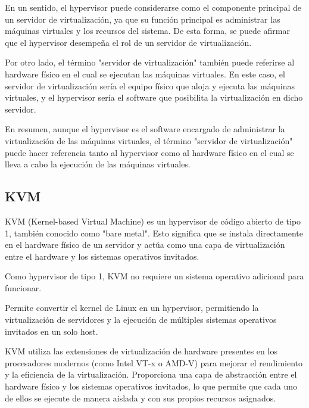 			En un sentido, el hypervisor puede considerarse como el componente principal de un servidor de virtualización, ya que su función principal es administrar las máquinas virtuales y los recursos del sistema. De esta forma, se puede afirmar que el hypervisor desempeña el rol de un servidor de virtualización.\par
			
			Por otro lado, el término "servidor de virtualización" también puede referirse al hardware físico en el cual se ejecutan las máquinas virtuales. En este caso, el servidor de virtualización sería el equipo físico que aloja y ejecuta las máquinas virtuales, y el hypervisor sería el software que posibilita la virtualización en dicho servidor.\par
			
			En resumen, aunque el hypervisor es el software encargado de administrar la virtualización de las máquinas virtuales, el término "servidor de virtualización" puede hacer referencia tanto al hypervisor como al hardware físico en el cual se lleva a cabo la ejecución de las máquinas virtuales.\par
			
			
			\subsection{KVM}
		
				KVM (Kernel-based Virtual Machine) es un hypervisor de código abierto de tipo 1, también conocido como "bare metal". Esto 	significa que se instala directamente en el hardware físico de un servidor y actúa como una capa de virtualización entre el hardware y los sistemas operativos invitados.\par
		
				Como hypervisor de tipo 1, KVM no requiere un sistema operativo adicional para funcionar.\par
		
				Permite convertir el kernel de Linux en un hypervisor, permitiendo la virtualización de servidores y la ejecución de múltiples sistemas operativos invitados en un solo host.\par
		
				KVM utiliza las extensiones de virtualización de hardware presentes en los procesadores modernos (como Intel VT-x o AMD-V) para mejorar el rendimiento y la eficiencia de la virtualización. Proporciona una capa de abstracción entre el hardware físico y los sistemas operativos invitados, lo que permite que cada uno de ellos se ejecute de manera aislada y con sus propios recursos asignados.\par
		
